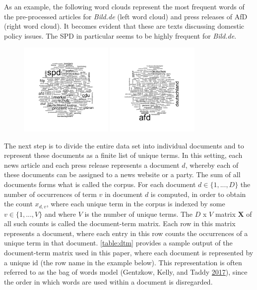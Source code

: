 \documentclass[
]{article}
\begin{document}
As an example, the following word clouds represent the most frequent
words of the pre-processed articles for \emph{Bild.de} (left word cloud)
and press releases of AfD (right word cloud). It becomes evident that
these are texts discussing domestic policy issues. The SPD in particular
seems to be highly frequent for \emph{Bild.de}.

\begin{figure}\centering

\includegraphics[width=0.4\textwidth,height=\textheight]{../figs/wordcloud_bild.png}
\includegraphics[width=0.4\textwidth,height=\textheight]{../figs/wordcloud_afd.png}

\end{figure}

The next step is to divide the entire data set into individual documents
and to represent these documents as a finite list of unique terms. In
this setting, each news article and each press release represents a
document \(d\), whereby each of these documents can be assigned to a
news website or a party. The sum of all documents forms what is called
the corpus. For each document \(d \in \lbrace 1,...,D \rbrace\) the
number of occurrences of term \(v\) in document \(d\) is computed, in
order to obtain the count \(x_{d,v}\), where each unique term in the
corpus is indexed by some \(v \in \lbrace 1,...,V \rbrace\) and where
\(V\) is the number of unique terms. The \(D\) x \(V\) matrix
\(\boldsymbol{X}\) of all such counts is called the document-term
matrix. Each row in this matrix represents a document, where each entry
in this row counts the occurrences of a unique term in that document.
\autoref{table:dtm} provides a sample output of the document-term matrix
used in this paper, where each document is represented by a unique id
(the row name in the example below). This representation is often
referred to as the bag of words model (Gentzkow, Kelly, and Taddy
\protect\hyperlink{ref-gentzkow_text_2017}{2017}), since the order in
which words are used within a document is disregarded.
\end{document}
